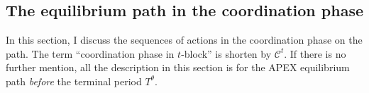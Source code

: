 \documentclass[12pt,letter]{article}
\newcommand{\Kappa}{\mathcal{C}}
\theoremstyle{definition}
\newtheorem{example}{Example}
\theoremstyle{remark}
\theoremstyle{claim}
\begin{document}
%
%    
%    
%        
%
%


\subsection{The equilibrium path in the coordination phase}
\label{sec:eq_cd}
In this section, I discuss the sequences of actions in the coordination phase on the path. The term ``coordination phase in $t$-block'' is shorten by $\Kappa^{t}$. If there is no further mention, all the description in this section is for the APEX equilibrium path \textit{before} the terminal period $T^{\theta}$. 



\end{document}
